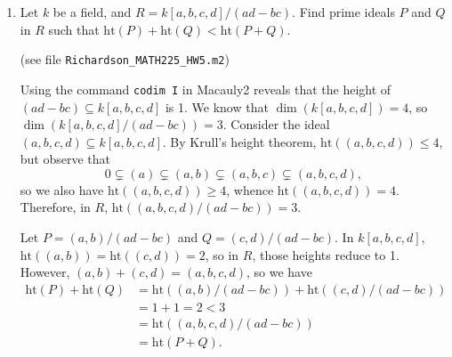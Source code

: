\documentclass[11pt,oneside,english]{amsart}
\theoremstyle{definition}
\newcommand{\MF}[1]{\mathfrak{#1}}
\begin{document}
\begin{enumerate}[leftmargin=*]
\begin{proof}
Since $\dim (R/\text{ann}(M))=0$, by definition all primes in $R/\text{ann}(M)$ must have height 0. Thus every prime there is incomparable, minimal, and maximal simultaneously. Thus, since $R$ is local, there can only one prime, $\MF{m}/\text{ann}(M)$, but this implies that $\MF{m}$ is the only (minimal) prime that contains $\text{ann}(M)$. Recall from Exercise 16 in section 5.1 that the radical of an ideal is the intersection of all minimal prime ideals containing it. Since $\MF{m}$ is the only prime ideal containing $\text{ann}(M)$, we have that $\sqrt{\text{ann}}=\MF{m}$ by Lemma 5.60, i.e. there exists an $n$ such that $\MF{m}^n\in\text{ann}(M)$. Then by definition, $\MF{m}^nM=0$.

Conversely, suppose $M$ is finitely generated and $\MF{m}^nM=0$. Then $\MF{m}^n\subseteq \text{ann}(M)$. Let $P$ be a prime ideal in $R$ that contains $\text{ann}(M)$. Then $P$ contains $\MF{m}^n$ and since $P$ is prime, $\MF{m}\subseteq P$. But since $\MF{m}$ is maximal it must be the case that $\MF{m}=P$, so $\MF{m}$ is the only prime containing $\text{ann}(M)$. But since $\MF{m}$ is the only such prime, it follows by the definition of dimension that $\dim (R/\text{ann}(M))=0$. And thus by Lemma 6.22, $M$ is finitely generated.
\end{proof}

\item Let $k$ be a field, and $R = k[a,b,c,d]/(ad-bc)$. Find prime ideals $P$ and $Q$ in $R$ such that $\textrm{ht}(P) + \textrm{ht}(Q) < \textrm{ht}(P + Q)$.

(see file \verb!Richardson_MATH225_HW5.m2!)

Using the command \verb!codim I! in Macauly2 reveals that the height of $(ad-bc)\subseteq k[a,b,c,d]$ is 1. We know that $\dim(k[a,b,c,d])=4$, so $\dim(k[a,b,c,d]/(ad-bc))=3$. Consider the ideal $(a,b,c,d)\subseteq k[a,b,c,d]$. By Krull's height theorem, $\text{ht}((a,b,c,d))\leq4$, but observe that
\[
0\subsetneq(a)\subsetneq(a,b)\subsetneq(a,b,c)\subsetneq(a,b,c,d),
\]
so we also have $\text{ht}((a,b,c,d))\geq4$, whence $\text{ht}((a,b,c,d))=4$. Therefore, in $R$, $\text{ht}((a,b,c,d)/(ad-bc))=3$. 

Let $P=(a,b)/(ad-bc)$ and $Q=(c,d)/(ad-bc)$. In $k[a,b,c,d]$, $\text{ht}((a,b))=\text{ht}((c,d))=2$, so in $R$, those heights reduce to 1. However, $(a,b)+(c,d)=(a,b,c,d)$, so we have 
\begin{align*}
\text{ht}(P)+\text{ht}(Q)&=\text{ht}((a,b)/(ad-bc))+\text{ht}((c,d)/(ad-bc))\\[2mm]
&=1+1=2<3\\[2mm]
&=\text{ht}((a,b,c,d)/(ad-bc))\\[2mm]
&=\text{ht}(P+Q).
\end{align*}


\end{enumerate}
\end{document}
